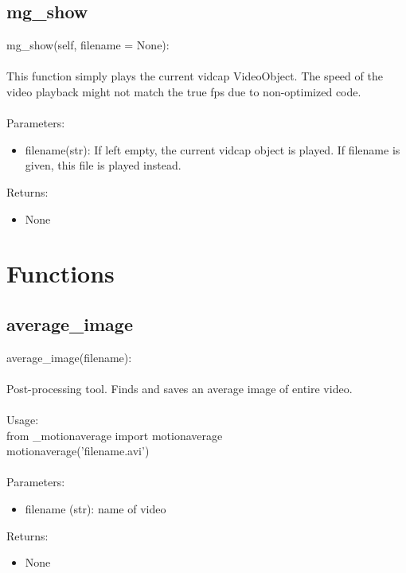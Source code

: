 \documentclass[9pt]{extarticle}
\begin{document}
\subsection{mg\_show}
mg\_show(self, filename = None):
\\\\
This function simply plays the current vidcap VideoObject. The speed of the video playback 
might not match the true fps due to non-optimized code. 
\\\\
Parameters:
\begin{itemize}
\item[] filename(str): If left empty, the current vidcap object is played. If filename is given,
this file is played instead.
\end{itemize}
Returns:
\begin{itemize}
    \item[] None
\end{itemize}



\section{Functions}
\subsection{average\_image}
    average\_image(filename):
    \\\\
    Post-processing tool. Finds and saves an average image of entire video. \\\\Usage:\\
    from \_motionaverage import motionaverage
    \\motionaverage('filename.avi')
    \\\\
    Parameters:
    \begin{itemize}
        \item [] filename (str): name of video 
    \end{itemize}
    Returns:
    \begin{itemize}
        \item [] None
    \end{itemize}
\end{document}

